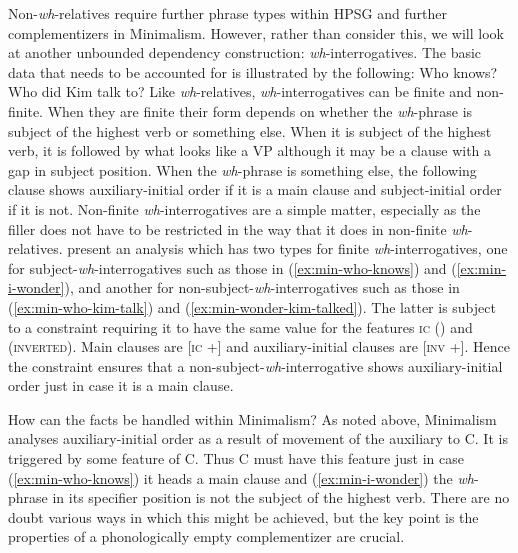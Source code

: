\documentclass[output=paper]{langsci/langscibook}
\begin{document}
Non-\textit{wh}-relatives require further phrase types within HPSG and further complementizers in
Minimalism. However, rather than consider this, we will look at another unbounded dependency
construction: \textit{wh}-interrogatives. The basic data that needs to be accounted for is
illustrated by the following: 
\eal
\ex Who knows? \label{ex:min-who-knows}
\label{ex:min-i-wonder}
\ex Who did Kim talk to? \label{ex:min-who-kim-talk}
\label{ex:min-wonder-kim-talked}
\label{ex:min-wonder-who-talk}
\zl 
Like \textit{wh}-relatives, \textit{wh}-interrogatives can be finite and non-finite. When they are
finite their form depends on whether the \textit{wh}-phrase is subject of the highest verb or
something else. When it is subject of the highest verb, it is followed by what looks like a VP
although it may be a clause with a gap in subject position. When the \textit{wh}-phrase is something
else, the following clause shows auxiliary-initial order if it is a main clause and subject-initial
order if it is not. Non-finite \textit{wh}-interrogatives are a simple matter, especially as the
filler does not have to be restricted in the way that it does in non-finite
\textit{wh}-relatives. \citet{GSag2000a-u} present an analysis which has two types for finite
\textit{wh}-interrogatives, one for subject-\textit{wh}-interrogatives such as those in
(\ref{ex:min-who-knows}) and (\ref{ex:min-i-wonder}), and another for
non-subject-\textit{wh}-interrogatives such as those in (\ref{ex:min-who-kim-talk}) and
(\ref{ex:min-wonder-kim-talked}). The latter is subject to a constraint requiring it to have the
same value for the features \textsc{ic} () and  (\textsc{inverted}). Main clauses are [\textsc{ic} +] and auxiliary-initial clauses are [\textsc{inv} +]. Hence the constraint ensures that a non-subject-\textit{wh}-interrogative shows auxiliary-initial order just in case it is a main clause.

How can the facts be handled within Minimalism? As noted above, Minimalism analyses
auxiliary-initial order as a result of movement of the auxiliary to C. It is triggered by some
feature of C. Thus C must have this feature just in case (\ref{ex:min-who-knows}) it heads a main
clause and (\ref{ex:min-i-wonder}) the \textit{wh}-phrase in its specifier position is not the
subject of the highest verb. There are no doubt various ways in which this might be achieved, but
the key point is the properties of a phonologically empty complementizer are
crucial.
\end{document}
